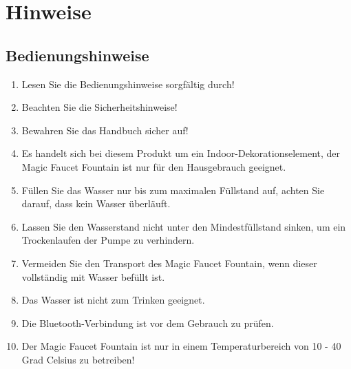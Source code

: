 %
%
%


\chapter{Hinweise}
\section{Bedienungshinweise}
\begin{enumerate}
	\item Lesen Sie die Bedienungshinweise sorgfältig durch!
	\item Beachten Sie die Sicherheitshinweise! 
	\item Bewahren Sie das Handbuch sicher auf!
	\item Es handelt sich bei diesem Produkt um ein Indoor-Dekorationselement, der Magic Faucet Fountain ist nur für den Hausgebrauch geeignet. 
	\item Füllen Sie das Wasser nur bis zum maximalen Füllstand auf, achten Sie darauf, dass kein Wasser überläuft.
	\item Lassen Sie den Wasserstand nicht unter den Mindestfüllstand sinken, um ein Trockenlaufen der Pumpe zu verhindern.
	\item Vermeiden Sie den Transport des Magic Faucet Fountain, wenn dieser vollständig mit Wasser befüllt ist.
	\item Das Wasser ist nicht zum Trinken geeignet.
	\item Die Bluetooth-Verbindung ist vor dem Gebrauch zu prüfen.
	\item Der Magic Faucet Fountain ist nur in einem Temperaturbereich von 10 - 40 Grad Celsius zu betreiben!
\end{enumerate}
\newpage
